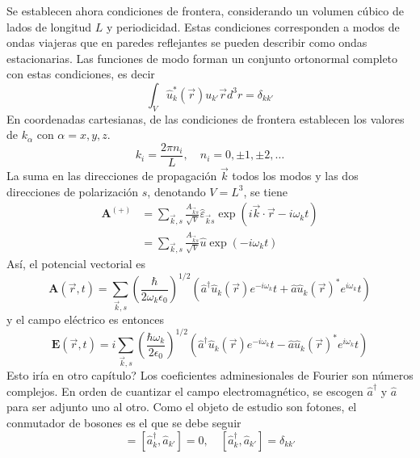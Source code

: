   Se establecen ahora condiciones de frontera, considerando un volumen cúbico de lados de longitud $L$ y periodicidad. Estas condiciones corresponden a modos de ondas viajeras que en paredes reflejantes se pueden describir como ondas estacionarias. Las funciones de modo forman un conjunto ortonormal completo con estas condiciones, es decir
  \begin{equation}
    \int_V \hat{u}_k^{*}(\vec{r}) u_{k'} \vec{r} d^3 r = \delta_{kk'}
  \end{equation}
  En coordenadas cartesianas, de las condiciones de frontera establecen los valores de $k_\alpha$ con $\alpha = x,y,z$.
  \begin{equation}
    k_i = \frac{2\pi n_i}{L}, \quad n_i = 0, \pm1, \pm2, \dots
  \end{equation}
  La suma en las direcciones de propagación $\vec{k}$ todos los modos y las dos direcciones de polarización $s$, denotando $V = L^3$, se tiene
  \begin{align}
    \mathbf{A}^{(+)} & = \sum_{\vec{k}, s} \frac{A_{\vec{k}s}}{\sqrt{V}} \hat{\varepsilon}_{\vec{k}s} \exp{ \left( i\vec{k}\cdot\vec{r} - i \omega_k t \right) } \\
                     & = \sum_{\vec{k},s} \frac{A_{\vec{k}s}}{\sqrt{V}} \hat{u} \exp{\left( - i \omega_k t \right)}
  \end{align}
  Así, el potencial vectorial es
  \begin{equation}
    \mathbf{A}(\vec{r}, t) = \sum_{\vec{k}, s} \left( \frac{\hbar}{2\omega_k \epsilon_0} \right)^{1/2} \left( \hat{a}^{\dagger} \hat{u}_k(\vec{r}) e^{-i\omega_k} t + \hat{a} \hat{u}_k(\vec{r})^{*} e^{i\omega_k} t \right)
  \end{equation}
  y el campo eléctrico es entonces
  \begin{equation}
    \mathbf{E}(\vec{r}, t) = i\sum_{\vec{k}, s} \left( \frac{\hbar\omega_k}{2\epsilon_0} \right)^{1/2} \left( \hat{a}^{\dagger} \hat{u}_k(\vec{r}) e^{-i\omega_k} t - \hat{a} \hat{u}_k(\vec{r})^{*} e^{i\omega_k} t \right)
  \end{equation}
  Esto iría en otro capítulo?
  Los coeficientes adminesionales de Fourier son números complejos. En orden de cuantizar el campo electromagnético, se escogen $\hat{a}^{\dagger}$ y $\hat{a}$ para ser adjunto uno al otro. Como el objeto de estudio son fotones, el conmutador de bosones es el que se debe seguir
  \begin{equation}
    [\hat{a}_k, \hat{a}^{\dagger}_{k'}] = [\hat{a}^{\dagger}_k, \hat{a}_{k'}] = 0, \quad [\hat{a}^{\dagger}_k, \hat{a}_{k'}] = \delta_{kk'}
  \end{equation}
\fi
